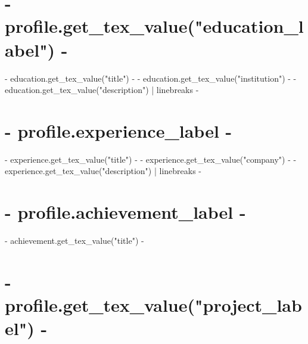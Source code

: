 \documentclass[letterpaper]{twentysecondcv-alice} %
\begin{document}
{{{{{{{{{{\section{ {{ - profile.get_tex_value("education_label") - }} }
{%
\begin{twenty} %
  { {{ - education.get_tex_value("title") - }} }
  { {{ - education.get_tex_value("institution") - }} }
  { {{ - education.get_tex_value("description") | linebreaks - }}  }
\end{twenty}
{%
{%
{%
\section{ {{ - profile.experience_label - }} }
{%
\begin{twenty} %
  { {{ - experience.get_tex_value("title") - }} }
  { {{ - experience.get_tex_value("company") - }} }
  { {{ - experience.get_tex_value("description") | linebreaks - }}  }
\end{twenty}
{%
{%
{%
\section{ {{ - profile.achievement_label - }} }
{%
\begin{twenty}
  { {{ - achievement.get_tex_value("title") - }} }
\end{twenty}
{%
{%
{%
\section{ {{ - profile.get_tex_value("project_label") - }} }
{%
{%
}}}}}}}}}}}}}}}}}}}}}}}}
\end{document}
